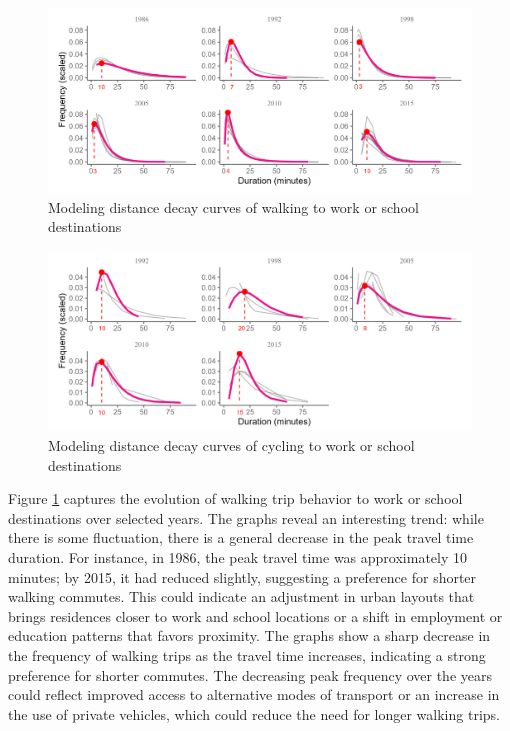 \documentclass[12pt,twoside]{reedthesis}
\begin{document}
\begin{landscape}
\begin{figure}

{\centering \includegraphics[width=0.9\linewidth]{work-wi} 

}

\caption{Modeling distance decay curves of walking to work or school destinations}\label{fig:work-wi}
\end{figure}
\begin{figure}

{\centering \includegraphics[width=0.9\linewidth]{work-ci} 

}

\caption{Modeling distance decay curves of cycling to work or school destinations}\label{fig:work-ci}
\end{figure}
\end{landscape}
Figure \ref{fig:work-wi} captures the evolution of walking trip behavior to work or school destinations over selected years. The graphs reveal an interesting trend: while there is some fluctuation, there is a general decrease in the peak travel time duration. For instance, in 1986, the peak travel time was approximately 10 minutes; by 2015, it had reduced slightly, suggesting a preference for shorter walking commutes. This could indicate an adjustment in urban layouts that brings residences closer to work and school locations or a shift in employment or education patterns that favors proximity. The graphs show a sharp decrease in the frequency of walking trips as the travel time increases, indicating a strong preference for shorter commutes. The decreasing peak frequency over the years could reflect improved access to alternative modes of transport or an increase in the use of private vehicles, which could reduce the need for longer walking trips.
\end{document}
